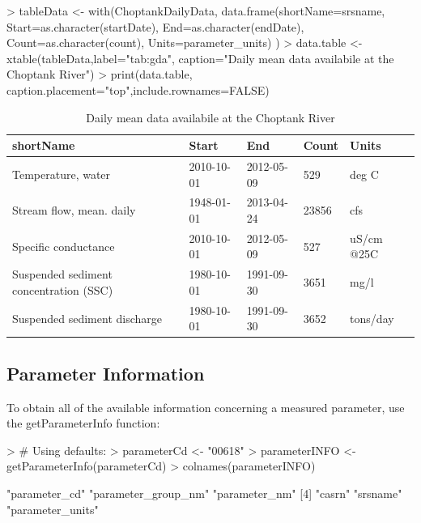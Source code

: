 \documentclass[a4paper,11pt]{article}
\begin{document}
\begin{Schunk}
\begin{Sinput}
> tableData <- with(ChoptankDailyData, 
       data.frame(shortName=srsname, 
       Start=as.character(startDate), 
       End=as.character(endDate), 
       Count=as.character(count),
       Units=parameter_units)
       )
> data.table <- xtable(tableData,label="tab:gda",
     caption="Daily mean data availabile at the Choptank River")
> print(data.table, 
       caption.placement="top",include.rownames=FALSE)
\end{Sinput}
\begin{table}[ht]
\centering
\caption{Daily mean data availabile at the Choptank River} 
\label{tab:gda}
\begin{tabular}{lllll}
  \hline
shortName & Start & End & Count & Units \\ 
  \hline
Temperature, water & 2010-10-01 & 2012-05-09 & 529 & deg C \\ 
  Stream flow, mean. daily & 1948-01-01 & 2013-04-24 & 23856 & cfs \\ 
  Specific conductance & 2010-10-01 & 2012-05-09 & 527 & uS/cm @25C \\ 
  Suspended sediment concentration (SSC) & 1980-10-01 & 1991-09-30 & 3651 & mg/l \\ 
  Suspended sediment discharge & 1980-10-01 & 1991-09-30 & 3652 & tons/day \\ 
   \hline
\end{tabular}
\end{table}\end{Schunk}


\FloatBarrier
\subsection{Parameter Information}
\label{sec:usgsParams}
To obtain all of the available information concerning a measured parameter, use the getParameterInfo function:
\begin{Schunk}
\begin{Sinput}
> # Using defaults:
> parameterCd <- "00618" 
> parameterINFO <- getParameterInfo(parameterCd)
> colnames(parameterINFO)
\end{Sinput}
\begin{Soutput}
[1] "parameter_cd"       "parameter_group_nm" "parameter_nm"      
[4] "casrn"              "srsname"            "parameter_units"   
\end{Soutput}
\end{Schunk}
\end{document}
